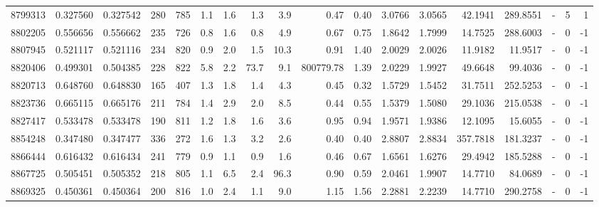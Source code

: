\begin{tabular}{rrrrrrrrrrrrrrrlrr}
   8799313 & 0.327560 &   0.327542 &  280 &  785 &      1.1 &      1.6 &     1.3 &      3.9 &       0.47 &        0.40 &  3.0766 &  3.0565 &   42.1941 &  289.8551 &             - &        5 &          1 \\
   8802205 & 0.556656 &   0.556662 &  235 &  726 &      0.8 &      1.6 &     0.8 &      4.9 &       0.67 &        0.75 &  1.8642 &  1.7999 &   14.7525 &  288.6003 &             - &        0 &         -1 \\
   8807945 & 0.521117 &   0.521116 &  234 &  820 &      0.9 &      2.0 &     1.5 &     10.3 &       0.91 &        1.40 &  2.0029 &  2.0026 &   11.9182 &   11.9517 &             - &        0 &         -1 \\
   8820406 & 0.499301 &   0.504385 &  228 &  822 &      5.8 &      2.2 &    73.7 &      9.1 &  800779.78 &        1.39 &  2.0229 &  1.9927 &   49.6648 &   99.4036 &             - &        0 &         -1 \\
   8820713 & 0.648760 &   0.648830 &  165 &  407 &      1.3 &      1.8 &     1.4 &      4.3 &       0.45 &        0.32 &  1.5729 &  1.5452 &   31.7511 &  252.5253 &             - &        0 &         -1 \\
   8823736 & 0.665115 &   0.665176 &  211 &  784 &      1.4 &      2.9 &     2.0 &      8.5 &       0.44 &        0.55 &  1.5379 &  1.5080 &   29.1036 &  215.0538 &             - &        0 &         -1 \\
   8827417 & 0.533478 &   0.533478 &  190 &  811 &      1.2 &      1.8 &     1.6 &      3.6 &       0.95 &        0.94 &  1.9571 &  1.9386 &   12.1095 &   15.6055 &             - &        0 &         -1 \\
   8854248 & 0.347480 &   0.347477 &  336 &  272 &      1.6 &      1.3 &     3.2 &      2.6 &       0.40 &        0.40 &  2.8807 &  2.8834 &  357.7818 &  181.3237 &             - &        0 &         -1 \\
   8866444 & 0.616432 &   0.616434 &  241 &  779 &      0.9 &      1.1 &     0.9 &      1.6 &       0.46 &        0.67 &  1.6561 &  1.6276 &   29.4942 &  185.5288 &             - &        0 &         -1 \\
   8867725 & 0.505451 &   0.505352 &  218 &  805 &      1.1 &      6.5 &     2.4 &     96.3 &       0.90 &        0.59 &  2.0461 &  1.9907 &   14.7710 &   84.0689 &             - &        0 &         -1 \\
   8869325 & 0.450361 &   0.450364 &  200 &  816 &      1.0 &      2.4 &     1.1 &      9.0 &       1.15 &        1.56 &  2.2881 &  2.2239 &   14.7710 &  290.2758 &             - &        0 &         -1 \\

\end{tabular}
